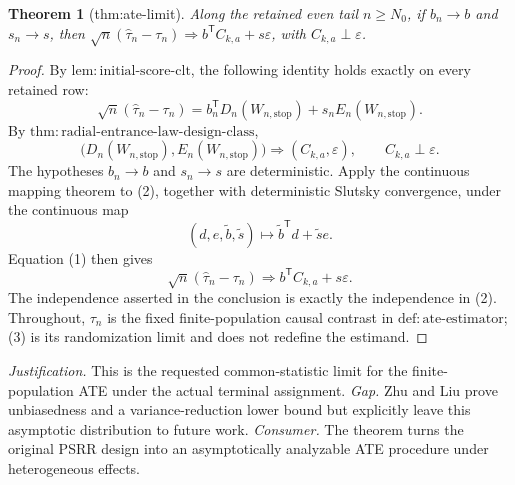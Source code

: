 \documentclass{article}
\newtheorem{theorem}{Theorem}
\begin{document}
\begin{theorem}[thm:ate-limit]\label{thm:ate-limit}
Along the retained even tail \(n\ge N_0\), if \(b_n\to b\) and \(s_n\to s\), then \(\sqrt n(\widehat\tau_n-\tau_n)\Rightarrow b^{\mathsf T}C_{k,a}+s\varepsilon\), with \(C_{k,a}\perp\varepsilon\).
\end{theorem}
\begin{proof}
By \(\mathrm{lem{:}initial\mbox{-}score\mbox{-}clt}\), the following identity holds exactly on every retained row:
\[
 \sqrt n(\widehat\tau_n-\tau_n)
 =b_n^{\mathsf T}D_n(W_{n,\mathrm{stop}})
  +s_nE_n(W_{n,\mathrm{stop}}). \tag{1}
\]
By \(\mathrm{thm{:}radial\mbox{-}entrance\mbox{-}law\mbox{-}design\mbox{-}class}\),
\[
 \bigl(D_n(W_{n,\mathrm{stop}}),E_n(W_{n,\mathrm{stop}})\bigr)
 \Rightarrow(C_{k,a},\varepsilon),
 \qquad C_{k,a}\perp\varepsilon. \tag{2}
\]
The hypotheses \(b_n\to b\) and \(s_n\to s\) are deterministic.  Apply the continuous mapping theorem to (2), together with deterministic Slutsky convergence, under the continuous map
\[
 (d,e,\widetilde b,\widetilde s)
 \longmapsto \widetilde b^{\mathsf T}d+\widetilde s e.
\]
Equation (1) then gives
\[
 \sqrt n(\widehat\tau_n-\tau_n)
 \Rightarrow b^{\mathsf T}C_{k,a}+s\varepsilon. \tag{3}
\]
The independence asserted in the conclusion is exactly the independence in (2).  Throughout, \(\tau_n\) is the fixed finite-population causal contrast in \(\mathrm{def{:}ate\mbox{-}estimator}\); (3) is its randomization limit and does not redefine the estimand.
\end{proof}
\par\smallskip\noindent \textit{Justification.} This is the requested common-statistic limit for the finite-population ATE under the actual terminal assignment. \textit{Gap.} Zhu and Liu prove unbiasedness and a variance-reduction lower bound but explicitly leave this asymptotic distribution to future work. \textit{Consumer.} The theorem turns the original PSRR design into an asymptotically analyzable ATE procedure under heterogeneous effects.
\end{document}
